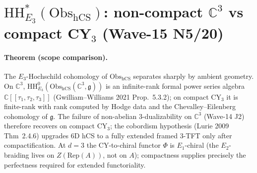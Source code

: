 
\providecommand{\Obs}{\mathrm{Obs}}
\providecommand{\hCS}{\mathrm{hCS}}
\providecommand{\CE}{\mathrm{CE}}
\providecommand{\Ch}{\mathrm{Ch}}
\providecommand{\Dolb}{\mathrm{Dolb}}
\providecommand{\chir}{\mathrm{chir}}
\providecommand{\dbar}{\bar\partial}
\providecommand{\kch}{\kappa_{\mathrm{ch}}}
\providecommand{\kcat}{\kappa_{\mathrm{cat}}}
\providecommand{\HH}{\mathrm{HH}}
\providecommand{\Sym}{\mathrm{Sym}}
\providecommand{\Tr}{\mathrm{Tr}}
\providecommand{\C}{\mathbb{C}}
\providecommand{\cO}{\mathcal{O}}
\providecommand{\cE}{\mathcal{E}}
\providecommand{\g}{\mathfrak{g}}
\providecommand{\fgl}{\mathfrak{gl}}
\providecommand{\Perf}{\mathrm{Perf}}
\providecommand{\Mod}{\mathrm{Mod}}
\providecommand{\Alg}{\mathrm{Alg}}
\providecommand{\Bord}{\mathrm{Bord}}
\providecommand{\Prim}{\mathrm{Prim}}

\section*{$\HH^*_{E_3}(\Obs_{\hCS})$: non-compact $\C^3$ vs compact CY$_3$ (Wave-15 N5/20)}

\paragraph{Theorem (scope comparison).}
The $E_3$-Hochschild cohomology of $\Obs_{\hCS}$ separates sharply by
ambient geometry. On $\C^3$, $\HH^0_{E_3}(\Obs_{\hCS}(\C^3, \g))$ is
an infinite-rank formal power series algebra
$\C[\![\tau_1, \tau_2, \tau_3]\!]$ (Gwilliam--Williams 2021 Prop.~5.3.2);
on compact CY$_3$ it is finite-rank with rank computed by Hodge data
and the Chevalley--Eilenberg cohomology of $\g$. The failure of
non-abelian 3-dualizability on $\C^3$ (Wave-14 J2) therefore recovers
on compact CY$_3$; the cobordism hypothesis (Lurie 2009 Thm~2.4.6)
upgrades 6D hCS to a fully extended framed 3-TFT only after
compactification. At $d=3$ the CY-to-chiral functor $\Phi$ is
$E_1$-chiral (the $E_2$-braiding lives on $Z(\mathrm{Rep}(A))$,
not on $A$); compactness supplies precisely the perfectness
required for extended functoriality.

